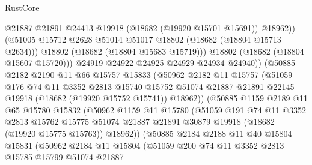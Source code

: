 \begin{lexlean}{RustCore}
\begin{coremodule}
                          @21887
                          @21891
                          @24413
                          @19918
                          (@18682 (@19920 @15701 @15691))
                          @18962))
                      (@51005 @15712 @2628 @51014 @51017 @18802 (@18682 (@18804 @15713 @2634)))
                      @18802
                      (@18682 (@18804 @15683 @15719)))
                    @18802
                    (@18682 (@18804 @15607 @15720)))
                  @24919
                  @24922
                  @24925
                  @24929
                  @24934
                  @24940))
              (@50885
                @2182
                @2190
                @11
                @66
                @15757
                @15833
                (@50962
                  @2182
                  @11
                  @15757
                  (@51059
                    @176
                    @74
                    @11
                    @3352
                    @2813
                    @15740
                    @15752
                    @51074
                    @21887
                    @21891
                    @22145
                    @19918
                    (@18682 (@19920 @15752 @15741))
                    @18962))
                (@50885
                  @1159
                  @2189
                  @11
                  @65
                  @15780
                  @15832
                  (@50962
                    @1159
                    @11
                    @15780
                    (@51059
                      @191
                      @74
                      @11
                      @3352
                      @2813
                      @15762
                      @15775
                      @51074
                      @21887
                      @21891
                      @30879
                      @19918
                      (@18682 (@19920 @15775 @15763))
                      @18962))
                  (@50885
                    @2184
                    @2188
                    @11
                    @40
                    @15804
                    @15831
                    (@50962
                      @2184
                      @11
                      @15804
                      (@51059
                        @200
                        @74
                        @11
                        @3352
                        @2813
                        @15785
                        @15799
                        @51074
                        @21887

\end{coremodule}
\end{lexlean}

